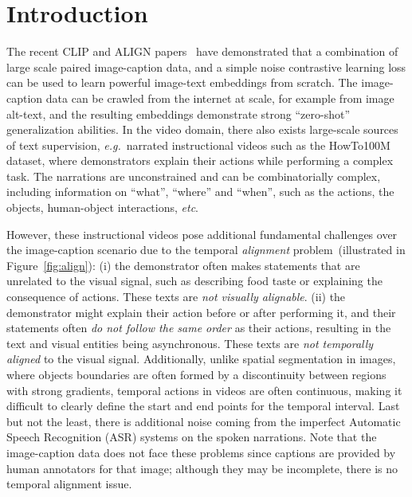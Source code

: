 \section{Introduction}\label{sec:intro}
\vspace{-1mm}
The recent CLIP and ALIGN papers~\cite{Radford21,Jia21} have demonstrated that 
a combination of large scale paired image-caption data, 
and a simple noise contrastive learning loss can be used to learn powerful image-text embeddings from scratch. 
The image-caption data can be crawled from the internet at scale, for example from image alt-text, 
and the resulting embeddings demonstrate strong ``zero-shot'' generalization abilities.
In the video domain, 
there also exists large-scale sources of text supervision, 
\emph{e.g.}~narrated instructional videos such as the  HowTo100M~\cite{Miech19} dataset,
where demonstrators explain their actions while performing a complex task.
The narrations are unconstrained and can be combinatorially complex, 
including information on ``what'', ``where'' and ``when'',  
such as the actions, the objects, human-object interactions, {\em etc}.

However, these instructional videos pose additional fundamental challenges 
over the image-caption scenario due to the temporal \emph{alignment} problem~(illustrated in Figure~\ref{fig:align}): 
(i) the demonstrator often makes statements that are unrelated to the visual signal, 
such as describing food taste or explaining the consequence of actions.
These texts are {\em not visually alignable}.
(ii) the demonstrator might explain their action before or after performing it,
and their statements often {\em do not follow the same order} as their actions,
resulting in the text and visual entities being asynchronous.
These texts are  {\em not temporally aligned} to the visual signal.
Additionally, unlike spatial segmentation in images, 
where objects boundaries are often formed by a discontinuity between regions with strong gradients, 
temporal actions in videos are often continuous, 
making it difficult to clearly define the start and end points for the temporal interval.
Last but not the least, 
there is additional noise coming from the imperfect 
Automatic Speech Recognition (ASR) systems on the spoken narrations.
Note that the image-caption data does not face these problems since captions are provided by human annotators for that image; 
although they may be incomplete, there is no temporal alignment issue.

